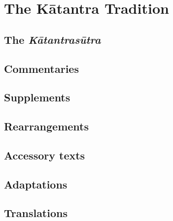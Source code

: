 \chapter{The Kātantra Tradition}

\section{The \emph{Kātantrasūtra}}

\section{Commentaries}

\section{Supplements}

\section{Rearrangements}

\section{Accessory texts}

\section{Adaptations}

\section{Translations}